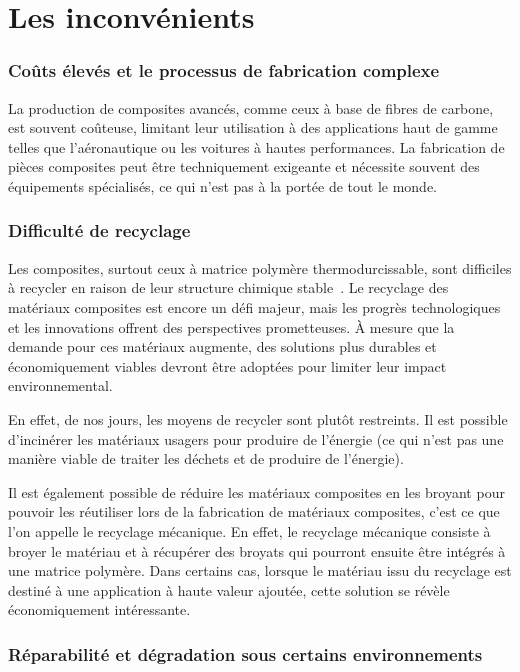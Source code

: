 \section{Les inconvénients}

\subsubsection{Coûts élevés et le processus de fabrication complexe}
La production de composites avancés, comme ceux à base de fibres de carbone, est souvent coûteuse, limitant leur utilisation à des applications haut de gamme telles que l’aéronautique ou les voitures à hautes performances.
La fabrication de pièces composites peut être techniquement exigeante et nécessite souvent des équipements spécialisés, ce qui n’est pas à la portée de tout le monde.

\subsubsection{Difficulté de recyclage}
Les composites, surtout ceux à matrice polymère thermodurcissable, sont difficiles à recycler en raison de leur structure chimique stable~\cite{mayer2019a}.
Le recyclage des matériaux composites est encore un défi majeur, mais les progrès technologiques et les innovations offrent des perspectives prometteuses.
À mesure que la demande pour ces matériaux augmente, des solutions plus durables et économiquement viables devront être adoptées pour limiter leur impact environnemental.

En effet, de nos jours, les moyens de recycler sont plutôt restreints. Il est possible d’incinérer les matériaux usagers pour produire de l’énergie (ce qui n’est pas une manière viable de traiter les déchets et de produire de l’énergie).

Il est également possible de réduire les matériaux composites en les broyant pour pouvoir les réutiliser lors de la fabrication de matériaux composites, c’est ce que l’on appelle le recyclage mécanique.
En effet, le recyclage mécanique consiste à broyer le matériau et à récupérer des broyats qui pourront ensuite être intégrés à une matrice polymère.
Dans certains cas, lorsque le matériau issu du recyclage est destiné à une application à haute valeur ajoutée, cette solution se révèle économiquement intéressante.



\subsubsection{Réparabilité et dégradation sous certains environnements}

